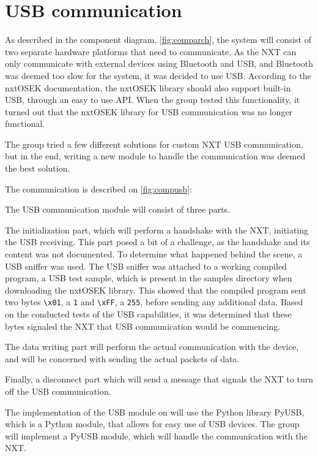 \section{USB communication}
\label{sec:usbdes}
As described in the component diagram, \autoref{fig:comparch}, the system will consist of two separate hardware platforms that need to communicate.
As the NXT can only communicate with external devices using Bluetooth and USB, and Bluetooth was deemed too slow for the system, it was decided to use USB.
According to the nxtOSEK documentation, the nxtOSEK library should also support built-in USB, through an easy to use API\cite{ecrobotUSB}.
When the group tested this functionality, it turned out that the nxtOSEK library for USB communication was no longer functional.

The group tried a few different solutions for custom NXT USB communication, but in the end, writing a new module to handle the communication was deemed the best solution.

The communication is described on \autoref{fig:compusb}:

The USB communication module will consist of three parts.

The initialization part, which will perform a handshake with the NXT, initiating the USB receiving.
This part posed a bit of a challenge, as the handshake and its content was not documented.
To determine what happened behind the scene, a USB sniffer was used.
The USB sniffer was attached to a working compiled program, a USB test sample, which is present in the samples directory when downloading the nxtOSEK library\cite{ecrobotUSB}.
This showed that the compiled program sent two bytes \texttt{\textbackslash{}x01}, a \texttt{1} and \texttt{\textbackslash{}xFF}, a \texttt{255}, before sending any additional data.%
Based on the conducted tests of the USB capabilities, it was determined that these bytes signaled the NXT that USB communication would be commencing.

The data writing part will perform the actual communication with the device, and will be concerned with sending the actual packets of data.

Finally, a disconnect part which will send a message that signals the NXT to turn off the USB communication.

The implementation of the USB module on will use the Python library PyUSB, which is a Python module, that allows for easy use of USB devices\cite{PyUSB}.
The group will implement a PyUSB module, which will handle the communication with the NXT.
